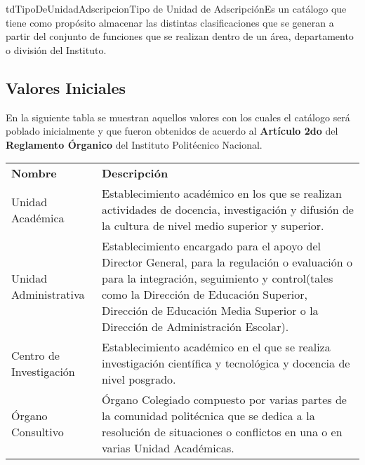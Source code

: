 	
	\begin{TipoDeDato}{tdTipoDeUnidadAdscripcion}{Tipo de Unidad de Adscripción}{Es un catálogo que tiene como propósito almacenar las distintas clasificaciones que se generan a partir del conjunto de funciones que se realizan dentro de un área, departamento o división del Instituto.}
	
	\begin{tdAtributos}
		
	
	\end{tdAtributos}
	
		\subsection{Valores Iniciales}
		
		 En la siguiente tabla se muestran aquellos valores con los cuales el catálogo será poblado inicialmente y que fueron obtenidos de acuerdo al \textbf{Artículo 2do} del \textbf{Reglamento Órganico} del Instituto Politécnico Nacional.\cdtEmpty
		
		\begin{longtable}{| p{}| p{}|}
	 			\rowcolor{colorPrincipal}
	 			\multicolumn{2}{|c|}{\bf \color{white} Valores Iniciales}\\
	 			\hline
	 			\rowcolor{colorSecundario}
	 			\bf \color{white} Nombre & \bf \color{white} Descripción \\
	 			\hline
	 			Unidad Académica & Establecimiento académico en los que se realizan actividades de docencia, investigación y difusión de la cultura de nivel medio superior y superior.\\
	 			\hline
	 			Unidad Administrativa & Establecimiento encargado para el apoyo del Director General, para la regulación o evaluación o para la integración, seguimiento y control(tales como la Dirección de Educación Superior, Dirección de Educación Media Superior o la Dirección de Administración Escolar). \\
				\hline
				Centro de Investigación & Establecimiento académico en el que se realiza investigación científica y tecnológica y docencia de nivel posgrado.\\
				\hline
				Órgano Consultivo & Órgano Colegiado compuesto por varias partes de la comunidad politécnica que se dedica a la resolución de situaciones o conflictos en una o en varias Unidad Académicas. \\
				\hline
	 		\end{longtable}
	\end{TipoDeDato}
	
